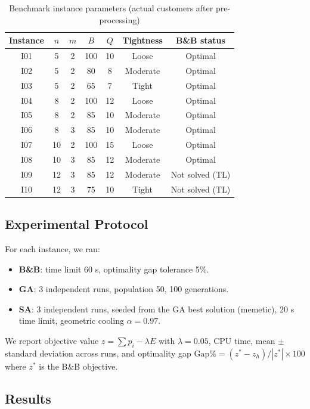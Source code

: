 \documentclass[12pt,a4paper]{article}
\begin{document}
\begin{table}[H]
\centering
\caption{Benchmark instance parameters (actual customers after pre-processing)}
\label{tab:instances}
\begin{tabular}{ccccccc}
\toprule
Instance & $n$ & $m$ & $B$ & $Q$ & Tightness & B\&B status \\
\midrule
I01 & 5  & 2 & 100 & 10 & Loose    & Optimal \\
I02 & 5  & 2 &  80 &  8 & Moderate & Optimal \\
I03 & 5  & 2 &  65 &  7 & Tight    & Optimal \\
I04 & 8  & 2 & 100 & 12 & Loose    & Optimal \\
I05 & 8  & 2 &  85 & 10 & Moderate & Optimal \\
I06 & 8  & 3 &  85 & 10 & Moderate & Optimal \\
I07 & 10 & 2 & 100 & 15 & Loose    & Optimal \\
I08 & 10 & 3 &  85 & 12 & Moderate & Optimal \\
I09 & 12 & 3 &  85 & 12 & Moderate & Not solved (TL) \\
I10 & 12 & 3 &  75 & 10 & Tight    & Not solved (TL) \\
\bottomrule
\end{tabular}
\end{table}

\subsection{Experimental Protocol}

For each instance, we ran:
\begin{itemize}
  \item \textbf{B\&B}: time limit 60 s, optimality gap tolerance 5\%.
  \item \textbf{GA}: 3 independent runs, population 50, 100 generations.
  \item \textbf{SA}: 3 independent runs, seeded from the GA best solution (memetic),
  20 s time limit, geometric cooling $\alpha=0.97$.
\end{itemize}
We report objective value $z = \sum p_i - \lambda E$ with $\lambda=0.05$, CPU time,
mean $\pm$ standard deviation across runs, and optimality gap
$\text{Gap}\% = (z^*-z_h)/|z^*|\times100$ where $z^*$ is the B\&B objective.

\subsection{Results}
\end{document}
